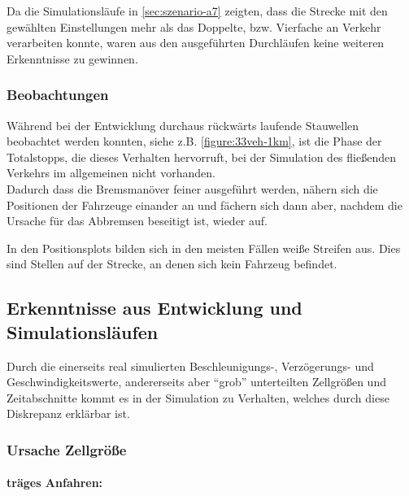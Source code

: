 Da die Simulationsläufe in \cref{sec:szenario-a7} zeigten, dass die Strecke mit den gewählten Einstellungen mehr als das Doppelte, bzw. Vierfache an Verkehr verarbeiten konnte, waren aus den ausgeführten Durchläufen keine weiteren Erkenntnisse zu gewinnen.



\subsubsection{Beobachtungen}

Während bei der Entwicklung durchaus rückwärts laufende Stauwellen beobachtet werden konnten, siehe z.B. \cref{figure:33veh-1km}, ist die Phase der Totalstopps, die dieses Verhalten hervorruft, bei der Simulation des fließenden Verkehrs im allgemeinen nicht vorhanden.
\\
Dadurch dass die Bremsmanöver feiner ausgeführt werden, nähern sich die Positionen der Fahrzeuge einander an und fächern sich dann aber, nachdem die Ursache für das Abbremsen beseitigt ist, wieder auf.

In den Positionsplots bilden sich in den meisten Fällen weiße Streifen aus. Dies sind Stellen auf der Strecke, an denen sich kein Fahrzeug befindet.





\subsection{Erkenntnisse aus Entwicklung und Simulationsläufen}

Durch die einerseits real simulierten Beschleunigungs-, Verzögerungs- und Geschwindigkeitswerte, andererseits aber \enquote{grob} unterteilten Zellgrößen und Zeitabschnitte kommt es in der Simulation zu Verhalten, welches durch diese Diskrepanz erklärbar ist.


\subsubsection{Ursache Zellgröße}

\paragraph{träges Anfahren:}
\label{sec:accelerategroove}

